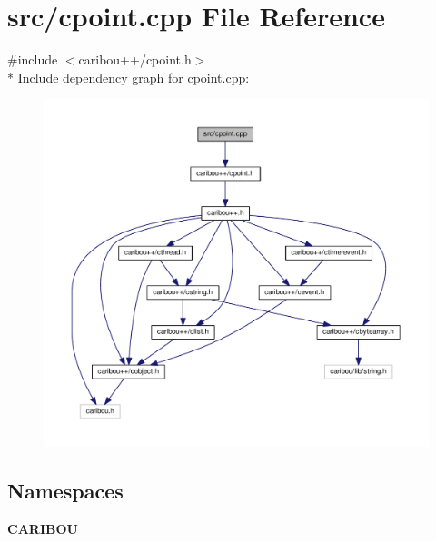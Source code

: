 \section{src/cpoint.cpp File Reference}
\label{cpoint_8cpp}
{\ttfamily \#include $<$caribou++/cpoint.\+h$>$}\\*
Include dependency graph for cpoint.\+cpp\+:
\nopagebreak
\begin{figure}[H]
\begin{center}
\leavevmode
\includegraphics[width=350pt]{cpoint_8cpp__incl}
\end{center}
\end{figure}
\subsection*{Namespaces}
\begin{DoxyCompactItemize}
\item 
 {\bf C\+A\+R\+I\+B\+OU}
\end{DoxyCompactItemize}

